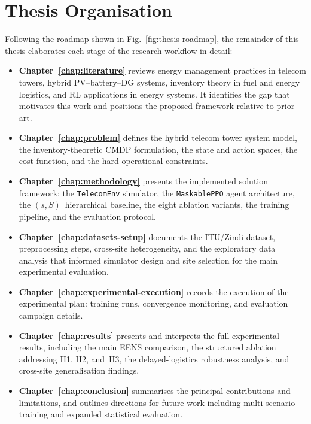 \section{Thesis Organisation}

Following the roadmap shown in Fig.~\ref{fig:thesis-roadmap}, the
remainder of this thesis elaborates each stage of the research workflow
in detail:

\begin{itemize}
  \item \textbf{Chapter~\ref{chap:literature}} reviews energy management
  practices in telecom towers, hybrid PV--battery--DG systems, inventory
  theory in fuel and energy logistics, and RL applications in energy systems.
  It identifies the gap that motivates this work and positions the proposed
  framework relative to prior art.

  \item \textbf{Chapter~\ref{chap:problem}} defines the hybrid telecom tower
  system model, the inventory-theoretic CMDP formulation, the state and action
  spaces, the cost function, and the hard operational constraints.

  \item \textbf{Chapter~\ref{chap:methodology}} presents the implemented
  solution framework: the \texttt{TelecomEnv} simulator, the \texttt{MaskablePPO}
  agent architecture, the $(s,S)$~hierarchical baseline, the eight ablation
  variants, the training pipeline, and the evaluation protocol.

  \item \textbf{Chapter~\ref{chap:datasets-setup}} documents the ITU/Zindi
  dataset, preprocessing steps, cross-site heterogeneity, and the exploratory
  data analysis that informed simulator design and site selection for the
  main experimental evaluation.

  \item \textbf{Chapter~\ref{chap:experimental-execution}} records the
  execution of the experimental plan: training runs, convergence monitoring,
  and evaluation campaign details.

  \item \textbf{Chapter~\ref{chap:results}} presents and interprets the full
  experimental results, including the main EENS comparison, the structured
  ablation addressing H1, H2, and~H3, the delayed-logistics robustness
  analysis, and cross-site generalisation findings.

  \item \textbf{Chapter~\ref{chap:conclusion}} summarises the principal
  contributions and limitations, and outlines directions for future work
  including multi-scenario training and expanded statistical evaluation.
\end{itemize}

\clearpage